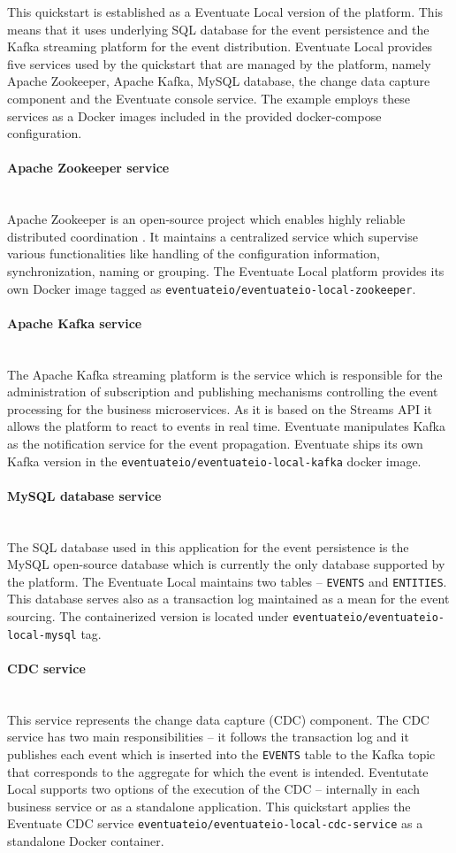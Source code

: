 \documentclass[oneside,
  digital, %
  table,   %
  nolof,     %
  nolot,     %
]{fithesis3}
\newcommand{\newlinepar}[1]{\paragraph{#1}\needspace{4\baselineskip}\mbox{}\\}
\begin{document}
This quickstart is established as a Eventuate Local version of the platform. This means that it uses underlying SQL database for the event persistence and the Kafka streaming platform for the event distribution. Eventuate Local provides five services used by the quickstart that are managed by the platform, namely Apache Zookeeper, Apache Kafka, MySQL database, the change data capture component and the Eventuate console service. The example employs these services as a Docker images included in the provided docker-compose configuration.

\newlinepar{Apache Zookeeper service}

Apache Zookeeper is an open-source project which enables highly reliable distributed coordination \cite{apache_zookeeper}. It maintains a centralized service which supervise various functionalities like handling of the configuration information, synchronization, naming or grouping. The Eventuate Local platform provides its own Docker image tagged as \texttt{eventuateio/eventuateio-local-zookeeper}.

\newlinepar{Apache Kafka service}

The Apache Kafka streaming platform is the service which is responsible for the administration of subscription and publishing mechanisms controlling the event processing for the business microservices. As it is based on the Streams API it allows the platform to react to events in real time. Eventuate manipulates Kafka as the notification service for the event propagation. Eventuate ships its own Kafka version in the \texttt{eventuateio/eventuateio-local-kafka} docker image.

\newlinepar{MySQL database service}

The SQL database used in this application for the event persistence is the MySQL open-source database which is currently the only database supported by the platform. The Eventuate Local maintains two tables -- \texttt{EVENTS} and \texttt{ENTITIES}. This database serves also as a transaction log maintained as a mean for the event sourcing. The containerized version is located under \texttt{eventuateio/eventuateio-local-mysql} tag.

\newlinepar{CDC service}

This service represents the change data capture (CDC) component. The CDC service has two main responsibilities -- it follows the transaction log and it publishes each event which is inserted into the \texttt{EVENTS} table to the Kafka topic that corresponds to the aggregate for which the event is intended. Eventutate Local supports two options of the execution of the CDC -- internally in each business service or as a standalone application. This quickstart applies the Eventuate CDC service \texttt{eventuateio/eventuateio-local-cdc-service} as a standalone Docker container.
\end{document}
